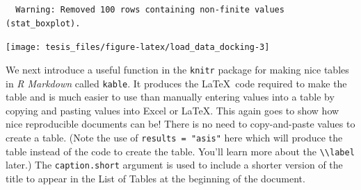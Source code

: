 \documentclass[12pt,twoside]{reedthesis}
\begin{document}
  \begin{Shaded}
  \begin{Highlighting}[]
  \NormalTok{(}\StringTok{ }\NormalTok{(} \NormalTok{, } \NormalTok{,} \NormalTok{(}\NormalTok{)) +}\StringTok{ }\NormalTok{()+}\NormalTok{()+}\NormalTok{(} \NormalTok{(} \NormalTok{, } \NormalTok{), } \NormalTok{(} \NormalTok{), } \NormalTok{(}\NormalTok{), }\NormalTok{(} \NormalTok{,} \NormalTok{), } \NormalTok{)}
  \end{Highlighting}
  \end{Shaded}
  
  \begin{verbatim}
  Warning: Removed 100 rows containing non-finite values (stat_boxplot).
  \end{verbatim}
  
  \begin{center}\texttt{[image: tesis\_files/figure-latex/load\_data\_docking-3]} \end{center}
  
  We next introduce a useful function in the \texttt{knitr} package for
  making nice tables in \emph{R Markdown} called \texttt{kable}. It
  produces the \LaTeX~code required to make the table and is much easier
  to use than manually entering values into a table by copying and pasting
  values into Excel or \LaTeX. This again goes to show how nice
  reproducible documents can be! There is no need to copy-and-paste values
  to create a table. (Note the use of \texttt{results\ =\ "asis"} here
  which will produce the table instead of the code to create the table.
  You'll learn more about the
  \texttt{\textbackslash{}\textbackslash{}label} later.) The
  \texttt{caption.short} argument is used to include a shorter version of
  the title to appear in the List of Tables at the beginning of the
  document.
  
\end{document}
